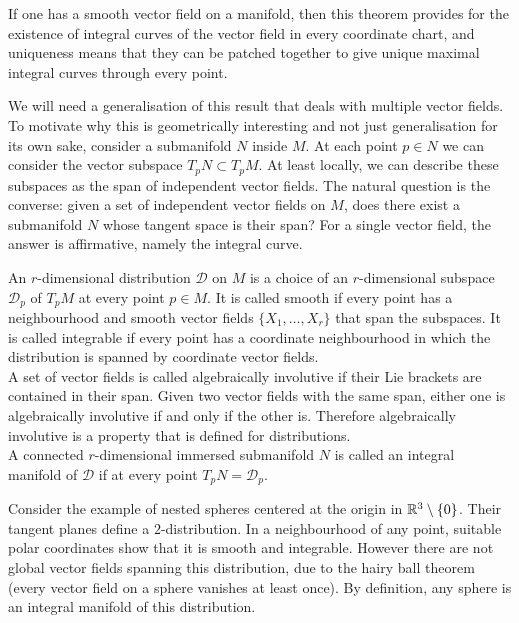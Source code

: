 If one has a smooth vector field on a manifold, then this theorem provides for the existence of integral curves of the vector field in every coordinate chart, and uniqueness means that they can be patched together to give unique maximal integral curves through every point.

We will need a generalisation of this result that deals with multiple vector fields.
To motivate why this is geometrically interesting and not just generalisation for its own sake, consider a submanifold $N$ inside $M$.
At each point $p \in N$ we can consider the vector subspace $T_pN \subset T_pM$.
At least locally, we can describe these subspaces as the span of independent vector fields.
The natural question is the converse: given a set of independent vector fields on $M$, does there exist a submanifold $N$ whose tangent space is their span?
For a single vector field, the answer is affirmative, namely the integral curve.

\begin{definition}
An $r$-dimensional distribution $\mathcal{D}$ on $M$ is a choice of an $r$-dimensional subspace $\mathcal{D}_p$ of $T_p M$ at every point $p \in M$.
It is called smooth if every point has a neighbourhood and smooth vector fields $\{X_1, \dots, X_r \}$ that span the subspaces. 
It is called integrable if every point has a coordinate neighbourhood in which the distribution is spanned by coordinate vector fields.
\\
A set of vector fields is called algebraically involutive if their Lie brackets are contained in their span.
Given two vector fields with the same span, either one is algebraically involutive if and only if the other is.
Therefore algebraically involutive is a property that is defined for distributions.\\
A connected $r$-dimensional immersed submanifold $N$ is called an integral manifold of $\mathcal{D}$ if at every point $T_pN = \mathcal{D}_p$.
\\\textup{\cite[2.2.1,.2.2.2,2.3.2]{Sharpe1997}}
\end{definition}

Consider the example of nested spheres centered at the origin in $\mathbb{R}^3\setminus\{0\}$. 
Their tangent planes define a $2$-distribution.
In a neighbourhood of any point, suitable polar coordinates show that it is smooth and integrable.
However there are not global vector fields spanning this distribution, due to the hairy ball theorem (every vector field on a sphere vanishes at least once).
By definition, any sphere is an integral manifold of this distribution.

